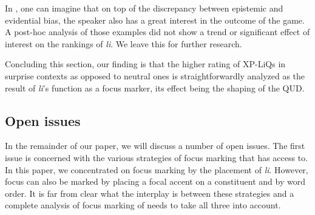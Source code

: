 \documentclass[output=paper]{langscibook}
\begin{document}
\noindent
In , one can imagine that on top of the discrepancy between epistemic and evidential bias, the speaker also has a great interest in the outcome of the game. A post-hoc analysis of those examples did not show a trend or significant effect of interest on the rankings of \textit{li}. We leave this for further research.

Concluding this section, our finding is that the higher rating of XP-LiQs in surprise contexts as opposed to neutral ones is straightforwardly analyzed as the result of \textit{li}'s function as a focus marker, its effect being the shaping of the QUD.

\subsection{Open issues}\label{sec:oi}
In the remainder of our paper, we will discuss a number of open issues. The first issue is concerned with the various strategies of focus marking that  has access to. In this paper, we concentrated on focus marking by the placement of \textit{li}. However, focus can also be marked by placing a focal accent on a constituent and by word order. It is far from clear what the interplay is between these strategies and a complete analysis of focus marking of  needs to take all three into account.



\end{document}
